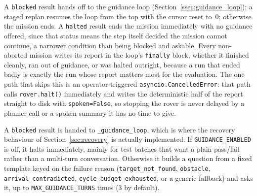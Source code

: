 A \texttt{blocked} result hands off to the guidance loop
(Section~\ref{ssec:guidance_loop}): a staged replan resumes the loop from the
top with the cursor reset to~0; otherwise the mission ends. A \texttt{halted}
result ends the mission immediately with no guidance offered, since that
status means the step itself decided the mission cannot continue, a
narrower condition than being blocked and askable. Every non-aborted mission
writes its report in the loop's \texttt{finally} block, whether it finished
cleanly, ran out of guidance, or was halted outright, because a run that
ended badly is exactly the run whose report matters most for the
evaluation. The one path that skips this is an operator-triggered
\texttt{asyncio.CancelledError}: that path calls \texttt{rover.halt()}
immediately and writes the deterministic half of the report straight to
disk with \texttt{spoken=False}, so stopping the rover is never delayed by a
planner call or a spoken summary it has no time to give.

\label{ssec:guidance_loop}

A \texttt{blocked} result is handed to \texttt{\_guidance\_loop}, which is
where the recovery behaviour of Section~\ref{sec:recovery} is actually
implemented. If \texttt{GUIDANCE\_ENABLED} is off, it halts immediately,
mainly for test batches that want a plain pass/fail rather than a multi-turn
conversation. Otherwise it builds a question from a fixed template keyed on
the failure reason (\texttt{target\_not\_found}, \texttt{obstacle},
\texttt{arrival\_contradicted}, \texttt{cycle\_budget\_exhausted}, or a
generic fallback) and asks it, up to \texttt{MAX\_GUIDANCE\_TURNS} times
(3 by default).

